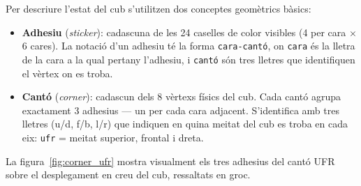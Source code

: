 \documentclass[12pt, a4paper]{article}
\begin{document}
Per descriure l'estat del cub s'utilitzen dos conceptes geomètrics bàsics:

\begin{itemize}
  \item \textbf{Adhesiu} (\textit{sticker}): cadascuna de les 24 caselles de color visibles (4 per cara $\times$ 6 cares). La notació d'un adhesiu té la forma \texttt{cara-cantó}, on \texttt{cara} és la lletra de la cara a la qual pertany l'adhesiu, i \texttt{cantó} són tres lletres que identifiquen el vèrtex on es troba.

  \item \textbf{Cantó} (\textit{corner}): cadascun dels 8 vèrtexs físics del cub. Cada cantó agrupa exactament 3 adhesius — un per cada cara adjacent. S'identifica amb tres lletres (u/d, f/b, l/r) que indiquen en quina meitat del cub es troba en cada eix: \texttt{ufr} = meitat superior, frontal i dreta.
\end{itemize}


La figura~\ref{fig:corner_ufr} mostra visualment els tres adhesius del cantó UFR sobre el desplegament en creu del cub, ressaltats en groc.
\end{document}
